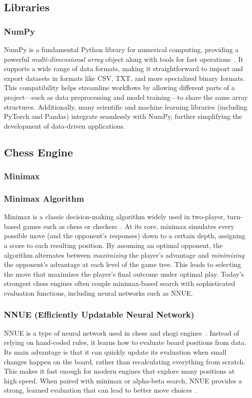 \documentclass[12pt,a4paper]{article}
\begin{document}
\subsection{Libraries}
\subsubsection*{NumPy}
NumPy is a fundamental Python library for numerical computing, providing a powerful
\emph{multi-dimensional array} object along with tools for fast operations~\cite{Harris2020Array}. It
supports a wide range of data formats, making it straightforward to import and export datasets
in formats like CSV, TXT, and more specialized binary formats. This compatibility helps
streamline workflows by allowing different parts of a project—such as data preprocessing and
model training—to share the same array structures. Additionally, many scientific and machine
learning libraries (including PyTorch and Pandas) integrate seamlessly with NumPy, further
simplifying the development of data-driven applications.

\subsection{Chess Engine}
\subsubsection{Minimax}
\subsubsection*{Minimax Algorithm}
Minimax is a classic decision-making algorithm widely used in two-player, turn-based
games such as chess or checkers~\cite{Shannon1950,vonNeumann1944}. At its core, minimax
simulates every possible move (and the opponent's responses) down to a certain depth, assigning
a score to each resulting position. By assuming an optimal opponent, the algorithm alternates
between \emph{maximizing} the player's advantage and \emph{minimizing} the opponent's advantage
at each level of the game tree. This leads to selecting the move that maximizes the player's
final outcome under optimal play. Today’s strongest chess engines often couple minimax-based
search with sophisticated evaluation functions, including neural networks such as NNUE.

\subsubsection*{NNUE (Efficiently Updatable Neural Network)}
NNUE is a type of neural network used in chess and shogi engines~\cite{Nasu2018}. Instead of
relying on hand-coded rules, it learns how to evaluate board positions from data. Its main advantage
is that it can quickly update its evaluation when small changes happen on the board, rather than
recalculating everything from scratch. This makes it fast enough for modern engines that explore
many positions at high speed. When paired with minimax or alpha-beta search, NNUE provides a strong,
learned evaluation that can lead to better move choices~\cite{StockfishNNUE2020}.
\end{document}
